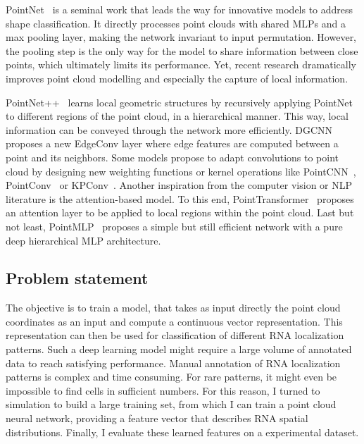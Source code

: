 PointNet~\cite{Qi_2017_CVPR} is a seminal work that leads the way for innovative models to address shape classification.
It directly processes point clouds with shared MLPs and a max pooling layer, making the network invariant to input permutation.
However, the pooling step is the only way for the model to share information between close points, which ultimately limits its performance.
Yet, recent research dramatically improves point cloud modelling and especially the capture of local information.

PointNet++~\cite{Qi_2017} learns local geometric structures by recursively applying PointNet to different regions of the point cloud, in a hierarchical manner.
This way, local information can be conveyed through the network more efficiently.
DGCNN~\cite{Wang_2019} proposes a new EdgeConv layer where edge features are computed between a point and its neighbors.
Some models propose to adapt convolutions to point cloud by designing new weighting functions or kernel operations like PointCNN~\cite{Li_2018}, PointConv~\cite{Wu_2019_CVPR} or KPConv~\cite{Thomas_2019_ICCV}.
Another inspiration from the computer vision or NLP literature is the attention-based model.
To this end, PointTransformer~\cite{Zhao_2021_ICCV} proposes an attention layer to be applied to local regions within the point cloud.
Last but not least, PointMLP~\cite{ma2022rethinking} proposes a simple but still efficient network with a pure deep hierarchical MLP architecture.

\subsection{Problem statement}
\label{subsec:problem_statement}

The objective is to train a model, that takes as input directly the point cloud coordinates as an input and compute a continuous vector representation.%
This representation can then be used for classification of different \ac{RNA} localization patterns.
Such a deep learning model might require a large volume of annotated data to reach satisfying performance.
Manual annotation of \ac{RNA} localization patterns is complex and time consuming.
For rare patterns, it might even be impossible to find cells in sufficient numbers.
For this reason, I turned to simulation to build a large training set, from which I can train a point cloud neural network, providing a feature vector that describes \ac{RNA} spatial distributions.
Finally, I evaluate these learned features on a experimental dataset.

